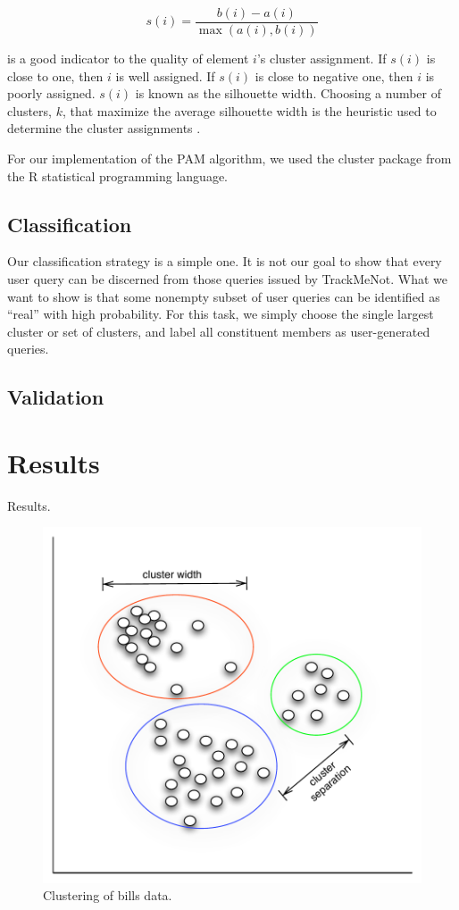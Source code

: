 \documentclass[11pt]{article}
\begin{document}
\begin{multicols}{2}
\[ s(i) = \frac{b(i)-a(i)}{\max{(a(i),b(i))}} \]

is a good indicator to the quality of element $i$'s cluster assignment. If $s(i)$ is close to one, then $i$ is well assigned. If $s(i)$ is close to negative one, then $i$ is poorly assigned. $s(i)$ is known as the silhouette width. Choosing a number of clusters, $k$, that maximize the average silhouette width is the heuristic used to determine the cluster assignments \cite{Kaufmann1990}.

For our implementation of the PAM algorithm, we used the cluster
package from the R statistical programming language\cite{Rcluster}.

\subsection{Classification}
\label{sec:classification}
Our classification strategy is a simple one. It is not our goal to show that every user query can be discerned from those queries issued by TrackMeNot. What we want to show is that some nonempty subset of user queries can be identified as ``real'' with high probability. For this task, we simply choose the single largest cluster or set of clusters, and label all constituent members as user-generated queries.

\subsection{Validation}


\section{Results}
\label{sec:results}

Results. \cite{tmn}

  \begin{figure}[h]
    \centering
    \includegraphics[width=\columnwidth]{clusterbill1}
    \caption{Clustering of bills data.}
    \label{fig:cluster.bill}
  \end{figure}


\end{multicols}
\end{document}
